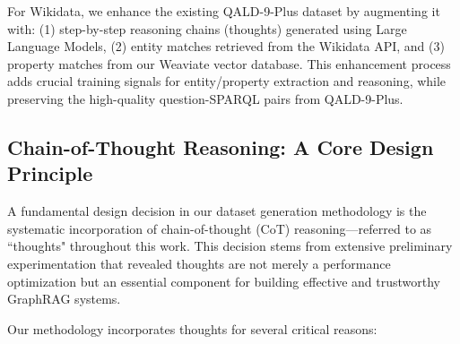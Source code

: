 For Wikidata, we enhance the existing QALD-9-Plus dataset by augmenting it with: (1) step-by-step reasoning chains (thoughts) generated using Large Language Models, (2) entity matches retrieved from the Wikidata API, and (3) property matches from our Weaviate vector database. This enhancement process adds crucial training signals for entity/property extraction and reasoning, while preserving the high-quality question-SPARQL pairs from QALD-9-Plus.

\subsection{Chain-of-Thought Reasoning: A Core Design Principle}
\label{cot-principle}

A fundamental design decision in our dataset generation methodology is the systematic incorporation of chain-of-thought (CoT) reasoning---referred to as ``thoughts" throughout this work. This decision stems from extensive preliminary experimentation that revealed thoughts are not merely a performance optimization but an essential component for building effective and trustworthy GraphRAG systems.

Our methodology incorporates thoughts for several critical reasons:

